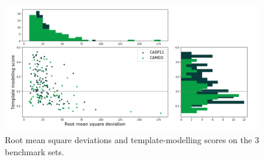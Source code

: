     \begin{figure}[H]
        \begin{center}
            \includegraphics[width=\textwidth, keepaspectratio]{imgs/fold.png}
            \caption{Root mean square deviations and template-modelling scores
            on the 3 benchmark sets.}
            \label{fold}
        \end{center}
    \end{figure}

